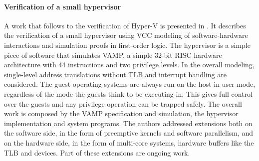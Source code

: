 
\paragraph{Verification of a small hypervisor}
A work that follows to the verification of Hyper-V is presented in \cite{autoverification}. It describes the verification of a small hypervisor using VCC modeling of software-hardware interactions and simulation proofs in first-order logic. The hypervisor is a simple piece of software that simulates VAMP, a simple 32-bit RISC hardware architecture with 44 instructions and two privilege levels. In the overall modeling, single-level address translations without TLB and interrupt handling are considered. The guest operating systems are always run on the host in user mode, regardless of the mode the guests think to be executing in. This gives full control over the guests and any privilege operation can be trapped safely.
The overall work is composed by the VAMP specification and simulation, the hypervisor implementation and system programs. The authors addressed extensions both on the software side, in the form of preemptive kernels and software parallelism, and on the hardware side, in the form of multi-core systems, hardware buffers like the TLB and devices. Part of these extensions are ongoing work.


